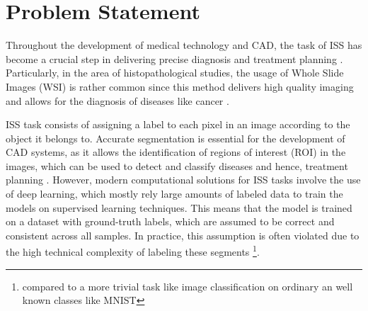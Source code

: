 \newpage

\section{Problem Statement}\label{sec:state_of_art}



Throughout the development of medical technology and \gls{CAD}, the
task of \gls{ISS} has become a crucial step in delivering precise diagnosis
and treatment planning \cite{Giri_Bhatia_2024}. Particularly, in the
area of histopathological studies, the usage of Whole Slide Images
(\gls{WSI}) is rather common since this method delivers high quality
imaging and allows for the diagnosis of diseases like cancer
\cite{YujiaEtAl2024}.

\gls{ISS} task consists of assigning a label to each pixel
in an image according to the object it belongs to. Accurate
segmentation is essential for the development of \gls{CAD} systems,
as it allows the identification of regions of interest (\gls{ROI}) in
the images, which can be used to detect and classify diseases and
hence, treatment planning \cite{Sarvamangala2022}. However, modern computational
solutions for \gls{ISS} tasks involve the use of deep learning, which
mostly rely large amounts of labeled data to train the models
on supervised learning techniques. This means that the model is trained on
a dataset with ground-truth labels, which are assumed to be correct
and consistent across all samples. In practice, this assumption is
often violated due to the high technical complexity of labeling these
segments \footnote{compared to a more trivial task like image classification
on ordinary an well known classes like MNIST}.



